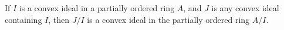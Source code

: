 If $I$ is a convex ideal in a partially ordered ring $A$, and $J$ is any convex ideal containing $I$, then $J/I$ is a convex ideal in the partially ordered ring $A/I$.
